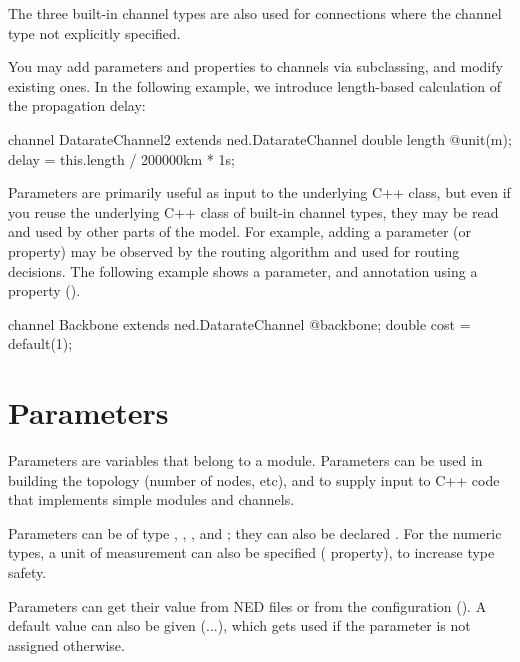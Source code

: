 \begin{note}
    The three built-in channel types are also used for connections where
    the channel type not explicitly specified.
\end{note}

You may add parameters and properties to channels via subclassing, and
modify existing ones. In the following example, we introduce length-based
calculation of the propagation delay:

\begin{ned}
channel DatarateChannel2 extends ned.DatarateChannel
{
    double length @unit(m);
    delay = this.length / 200000km * 1s;
}
\end{ned}

Parameters are primarily useful as input to the underlying C++ class, but
even if you reuse the underlying C++ class of built-in channel types, they
may be read and used by other parts of the model. For example, adding a
 parameter (or  property) may be observed by the
routing algorithm and used for routing decisions. The following example
shows a  parameter, and annotation using a property
().

\begin{ned}
channel Backbone extends ned.DatarateChannel
{
    @backbone;
    double cost = default(1);
}
\end{ned}



\section{Parameters}
\label{sec:ch-ned-lang:parameters}

Parameters are variables that belong to a module. Parameters can be
used in building the topology (number of nodes, etc), and to supply
input to C++ code that implements simple modules and channels.

Parameters can be of type , ,
,  and ; they can also
be declared . For the numeric types, a unit of
measurement can also be specified ( property), to increase
type safety.

Parameters can get their value from NED files or from the configuration
(). A default value can also be given (...\ttt{)}),
which gets used if the parameter is not assigned otherwise.

